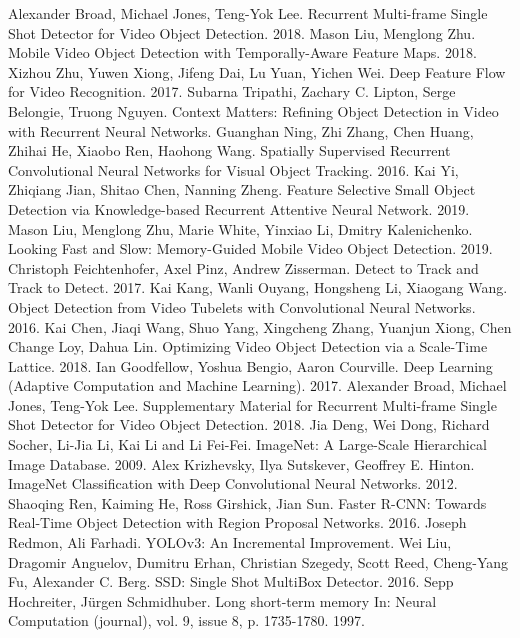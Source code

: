 \documentclass[conference]{IEEEtran}
\begin{document}
\begin{thebibliography}{00}
 Alexander Broad, Michael Jones, Teng-Yok Lee. Recurrent Multi-frame Single Shot Detector for Video Object Detection. 2018.
 Mason Liu, Menglong Zhu. Mobile Video Object Detection with Temporally-Aware Feature Maps. 2018.
 Xizhou Zhu, Yuwen Xiong, Jifeng Dai, Lu Yuan, Yichen Wei. Deep Feature Flow for Video Recognition. 2017.
 Subarna Tripathi, Zachary C. Lipton, Serge Belongie, Truong Nguyen. Context Matters: Refining Object Detection in Video with Recurrent Neural Networks.
 Guanghan Ning, Zhi Zhang, Chen Huang, Zhihai He, Xiaobo Ren, Haohong Wang. Spatially Supervised Recurrent Convolutional Neural Networks for Visual Object Tracking. 2016.
 Kai Yi, Zhiqiang Jian, Shitao Chen, Nanning Zheng. Feature Selective Small Object Detection via Knowledge-based Recurrent Attentive Neural Network. 2019.
 Mason Liu, Menglong Zhu, Marie White, Yinxiao Li, Dmitry Kalenichenko. Looking Fast and Slow: Memory-Guided Mobile Video Object Detection. 2019.
 Christoph Feichtenhofer, Axel Pinz, Andrew Zisserman. Detect to Track and Track to Detect. 2017.
 Kai Kang, Wanli Ouyang, Hongsheng Li, Xiaogang Wang. Object Detection from Video Tubelets with Convolutional Neural Networks. 2016.
 Kai Chen, Jiaqi Wang, Shuo Yang, Xingcheng Zhang, Yuanjun Xiong, Chen Change Loy, Dahua Lin. Optimizing Video Object Detection via a Scale-Time Lattice. 2018.
 Ian Goodfellow, Yoshua Bengio, Aaron Courville. Deep Learning (Adaptive Computation and Machine Learning). 2017.
 Alexander Broad, Michael Jones, Teng-Yok Lee. Supplementary Material for Recurrent Multi-frame Single Shot Detector for Video Object Detection. 2018.
 Jia Deng, Wei Dong, Richard Socher, Li-Jia Li, Kai Li and Li Fei-Fei. ImageNet: A Large-Scale Hierarchical Image Database. 2009.
 Alex Krizhevsky, Ilya Sutskever, Geoffrey E. Hinton. ImageNet Classification with Deep Convolutional Neural Networks. 2012.
 Shaoqing Ren, Kaiming He, Ross Girshick, Jian Sun. Faster R-CNN: Towards Real-Time Object Detection with Region Proposal Networks. 2016. 
 Joseph Redmon, Ali Farhadi. YOLOv3: An Incremental Improvement.
 Wei Liu, Dragomir Anguelov, Dumitru Erhan, Christian Szegedy, Scott Reed, Cheng-Yang Fu, Alexander C. Berg. SSD: Single Shot MultiBox Detector. 2016.
 Sepp Hochreiter, Jürgen Schmidhuber. Long short-term memory In: Neural Computation (journal), vol. 9, issue 8, p. 1735-1780. 1997.

\end{thebibliography}
\end{document}
